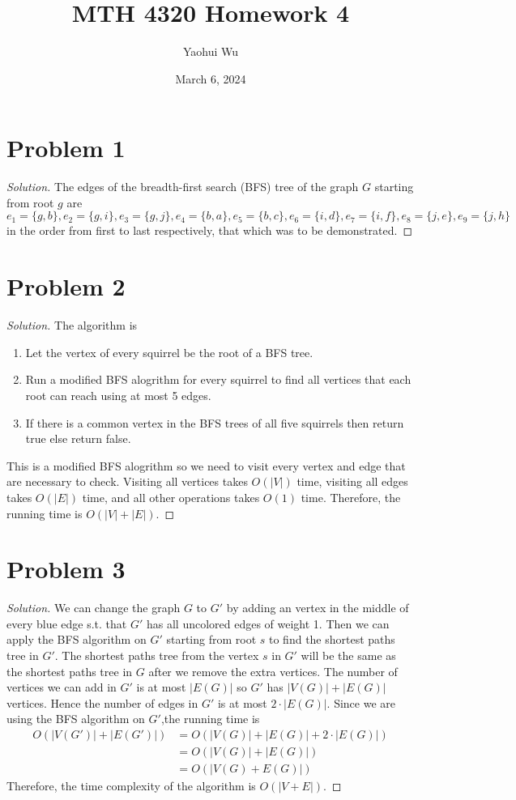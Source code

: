 \documentclass[12pt]{article}
\title{MTH 4320 Homework 4}
\author{Yaohui Wu}
\date{March 6, 2024}
\newenvironment*{solution}{\begin{proof}[Solution]}{\end{proof}}
\begin{document}
\maketitle
\section*{Problem 1}
\begin{solution}
    The edges of the breadth-first search (BFS) tree of the graph \(G\)
    starting from root \(g\) are \(e_1=\{g,b\},e_2=\{g,i\},e_3=\{g,j\},e_4=\{
        b,a\},e_5=\{b,c\},e_6=\{i,d\},e_7=\{i,f\},e_8=\{j,e\},e_9=\{j,h\}\) in
        the order from first to last respectively, that which was to be
        demonstrated.
\end{solution}
\section*{Problem 2}
\begin{solution}
    The algorithm is
    \begin{enumerate}
        \item Let the vertex of every squirrel be the root of a BFS tree.
        \item Run a modified BFS alogrithm for every squirrel to find all vertices
        that each root can reach using at most 5 edges.
        \item If there is a common vertex in the BFS trees of all five
        squirrels then return true else return false.
    \end{enumerate}
    This is a modified BFS alogrithm so we need to visit every vertex and edge
    that are necessary to check. Visiting all vertices takes \(O(|V|)\) time,
    visiting all edges takes \(O(|E|)\) time, and all other operations takes
    \(O(1)\) time. Therefore, the running time is \(O(|V|+|E|)\).
\end{solution}
\section*{Problem 3}
\begin{solution}
    We can change the graph \(G\) to \(G'\) by adding an vertex in the middle
    of every blue edge s.t. that \(G'\) has all uncolored edges of weight 1.
    Then we can apply the BFS algorithm on \(G'\) starting from root \(s\) to
    find the shortest paths tree in \(G'\). The shortest paths tree from the
    vertex \(s\) in \(G'\) will be the same as the shortest paths tree in \(G
    \) after we remove the extra vertices. The number of vertices we can add
    in \(G'\) is at most \(|E(G)|\) so \(G'\) has \(|V(G)|+|E(G)|\) vertices.
    Hence the number of edges in \(G'\) is at most \(2\cdot|E(G)|\). Since we
    are using the BFS algorithm on \(G'\),the running time is
    \begin{align*}
        O(|V(G')|+|E(G')|) &=O(|V(G)|+|E(G)|+2\cdot|E(G)|)\\ &=O(|V(G)|+|E(G)|
        )\\ &=O(|V(G)+E(G)|)
    \end{align*}
    Therefore, the time complexity of the algorithm is \(O(|V+E|)\).
\end{solution}
\end{document}
